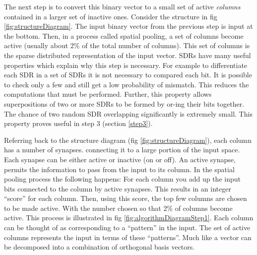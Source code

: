 \documentclass[a4paper]{jpconf}
\begin{document}
%				
			The next step is to convert this binary vector to a small set of active \emph{columns} contained in a larger set of inactive ones. Consider the structure in fig \ref{fig:structureDiagram}. The input binary vector from the previous step is input at the bottom. Then, in a process called spatial pooling, a set of columns become active (usually about 2\% of the total number of columns). This set of columns is the sparse distributed representation of the input vector. SDRs have many useful properties which explain why this step is necessary. For example to differentiate each SDR in a set of SDRs it is not necessary to compared each bit. It is possible to check only a few and still get a low probability of mismatch. This reduces the computations that must be performed. Further, this property allows superpositions of two or more SDRs to be formed by or-ing their bits together. The chance of two random SDR overlapping significantly is extremely small. This property proves useful in step 3 (section \ref{step3}).
			
%				
			Referring back to the structure diagram (fig \ref{fig:structureDiagram}), each column has a number of synapses. connecting it to a large portion of the input space. Each synapse can be either active or inactive (on or off). An active synapse, permits the information to pass from the input to its column. In the spatial pooling process the following happens: For each column you add up the input bits connected to the column by active synapses. This results in an integer ``score'' for each column. Then, using this score, the top few columns are chosen to be made active. With the number chosen so that 2\% of columns become active. This process is illustrated in fig \ref{fig:algorithmDiagramStep1}. Each column can be thought of as corresponding to a ``pattern'' in the input. The set of active columns represents the input in terms of these ``patterns''. Much like a vector can be decomposed into a combination of orthogonal basis vectors.
			
\end{document}
